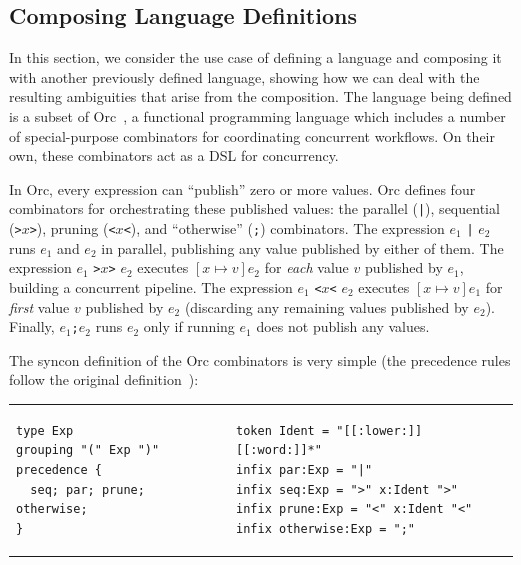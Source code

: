 \documentclass[runningheads]{llncs}
\newcommand{\ocaml}{\lstinline[language={[objective]caml}]}
\begin{document}


\subsection{Composing Language Definitions} \label{sec:evaluation-orc}

In this section, we consider the use case of defining a language
and composing it with another previously defined language, showing
how we can deal with the resulting ambiguities that arise from the
composition.
%
The language being defined is a subset of
Orc~\cite{kitchinOrc2009}, a functional programming language which
includes a number of special-purpose combinators for coordinating
concurrent workflows. On their own, these combinators act as a DSL
for concurrency.

In Orc, every expression can ``publish'' zero or more values. Orc
defines four combinators for orchestrating these published values:
the parallel (\ocaml{|}), sequential (\ocaml{>}$x$\ocaml{>}),
pruning (\ocaml{<}$x$\ocaml{<}), and ``otherwise'' (\ocaml{;})
combinators.
%
The expression $e_1$ \ocaml{|} $e_2$ runs $e_1$ and
$e_2$ in parallel, publishing any value published by either of
them.
%
The expression $e_1$ \ocaml{>}$x$\ocaml{>} $e_2$ executes
$[x\mapsto v]e_2$ for \emph{each} value $v$ published by $e_1$,
building a concurrent pipeline.
%
The expression $e_1$ \ocaml{<}$x$\ocaml{<} $e_2$ executes
$[x\mapsto v]e_1$ for \emph{first} value $v$ published by $e_2$
(discarding any remaining values published by $e_2$).
%
Finally, $e_1$\ocaml{;}$e_2$ runs $e_2$ only if running $e_1$ does
not publish any values.

The syncon definition of the Orc combinators is very simple (the
precedence rules follow the original
definition~\cite{kitchinOrc2009}):

\begin{tabular}{ll}
\small
\begin{lstlisting}[language=syncon,boxpos=t]
type Exp
grouping "(" Exp ")"
precedence {
  seq; par; prune; otherwise;
}
\end{lstlisting}
&
\small
\begin{lstlisting}[language=syncon,boxpos=t]
token Ident = "[[:lower:]][[:word:]]*"
infix par:Exp = "|"
infix seq:Exp = ">" x:Ident ">"
infix prune:Exp = "<" x:Ident "<"
infix otherwise:Exp = ";"
\end{lstlisting}
\end{tabular}\smallskip
\end{document}
